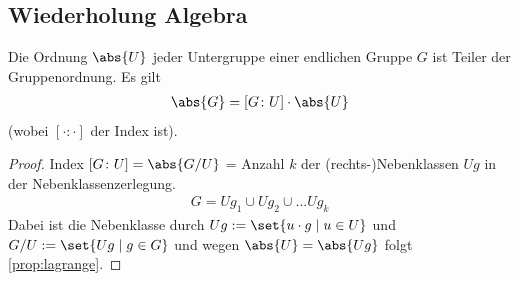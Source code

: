 \subsection*{Wiederholung Algebra}
\begin{proposition}\label{prop:lagrange}
	Die Ordnung $\abs{U}$ jeder Untergruppe einer endlichen Gruppe $G$ ist Teiler der Gruppenordnung. Es gilt
	\begin{align*}
		\abs{G} = [G\colon U]\cdot \abs{U}
	\end{align*}
	(wobei $[\cdot\colon \cdot]$ der Index ist).
\end{proposition}
\begin{proof}
	Index $[G\colon U] = \abs{G/U}$ = Anzahl $k$ der (rechts-)Nebenklassen $Ug$ in der Nebenklassenzerlegung.
	\begin{align*}
		G = U g_1 \cup U g_2 \cup \dots U g_k
	\end{align*}
	Dabei ist die Nebenklasse durch $Ug := \set{u\cdot g \mid u \in U}$ und $G/U := \set{Ug \mid g \in G}$ und wegen $\abs{U} = \abs{Ug}$ folgt \cref{prop:lagrange}.
\end{proof}
